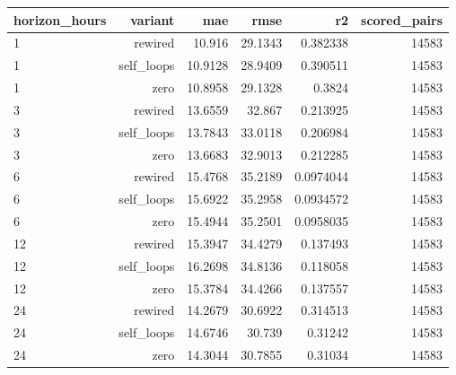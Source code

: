 \begin{tabular}{lrrrrr}
\hline
horizon\_hours & variant & mae & rmse & r2 & scored\_pairs \\
\hline
1 & rewired & 10.916 & 29.1343 & 0.382338 & 14583 \\
1 & self\_loops & 10.9128 & 28.9409 & 0.390511 & 14583 \\
1 & zero & 10.8958 & 29.1328 & 0.3824 & 14583 \\
3 & rewired & 13.6559 & 32.867 & 0.213925 & 14583 \\
3 & self\_loops & 13.7843 & 33.0118 & 0.206984 & 14583 \\
3 & zero & 13.6683 & 32.9013 & 0.212285 & 14583 \\
6 & rewired & 15.4768 & 35.2189 & 0.0974044 & 14583 \\
6 & self\_loops & 15.6922 & 35.2958 & 0.0934572 & 14583 \\
6 & zero & 15.4944 & 35.2501 & 0.0958035 & 14583 \\
12 & rewired & 15.3947 & 34.4279 & 0.137493 & 14583 \\
12 & self\_loops & 16.2698 & 34.8136 & 0.118058 & 14583 \\
12 & zero & 15.3784 & 34.4266 & 0.137557 & 14583 \\
24 & rewired & 14.2679 & 30.6922 & 0.314513 & 14583 \\
24 & self\_loops & 14.6746 & 30.739 & 0.31242 & 14583 \\
24 & zero & 14.3044 & 30.7855 & 0.31034 & 14583 \\
\hline
\end{tabular}
